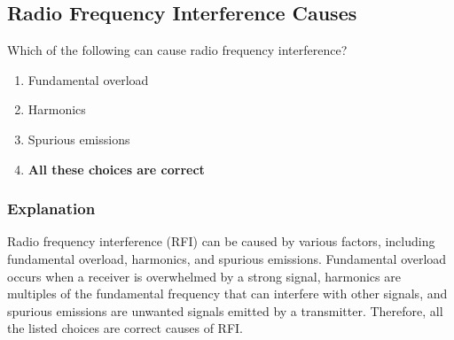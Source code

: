\subsection{Radio Frequency Interference Causes}
\label{T7B03}

\begin{tcolorbox}[colback=gray!10!white,colframe=black!75!black,title=T7B03]
Which of the following can cause radio frequency interference?
\begin{enumerate}[noitemsep]
    \item Fundamental overload
    \item Harmonics
    \item Spurious emissions
    \item \textbf{All these choices are correct}
\end{enumerate}
\end{tcolorbox}

\subsubsection*{Explanation}
Radio frequency interference (RFI) can be caused by various factors, including fundamental overload, harmonics, and spurious emissions. Fundamental overload occurs when a receiver is overwhelmed by a strong signal, harmonics are multiples of the fundamental frequency that can interfere with other signals, and spurious emissions are unwanted signals emitted by a transmitter. Therefore, all the listed choices are correct causes of RFI.
